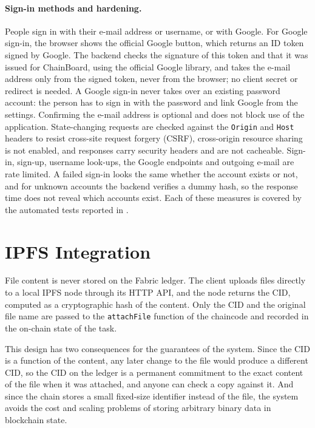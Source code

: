 \paragraph*{Sign-in methods and hardening.} People sign in with their e-mail address or username, or with Google. For Google sign-in, the browser shows the official Google button, which returns an ID token signed by Google. The backend checks the signature of this token and that it was issued for ChainBoard, using the official Google library, and takes the e-mail address only from the signed token, never from the browser; no client secret or redirect is needed. A Google sign-in never takes over an existing password account: the person has to sign in with the password and link Google from the settings. Confirming the e-mail address is optional and does not block use of the application. State-changing requests are checked against the \texttt{Origin} and \texttt{Host} headers to resist cross-site request forgery (CSRF), cross-origin resource sharing is not enabled, and responses carry security headers and are not cacheable. Sign-in, sign-up, username look-ups, the Google endpoints and outgoing e-mail are rate limited. A failed sign-in looks the same whether the account exists or not, and for unknown accounts the backend verifies a dummy hash, so the response time does not reveal which accounts exist. Each of these measures is covered by the automated tests reported in .

\section{IPFS Integration}
\label{sec:ipfs-integration}

File content is never stored on the Fabric ledger. The client uploads files directly to a local IPFS node through its HTTP API, and the node returns the CID, computed as a cryptographic hash of the content. Only the CID and the original file name are passed to the \texttt{attachFile} function of the chaincode and recorded in the on-chain state of the task.

This design has two consequences for the guarantees of the system. Since the CID is a function of the content, any later change to the file would produce a different CID, so the CID on the ledger is a permanent commitment to the exact content of the file when it was attached, and anyone can check a copy against it. And since the chain stores a small fixed-size identifier instead of the file, the system avoids the cost and scaling problems of storing arbitrary binary data in blockchain state.

